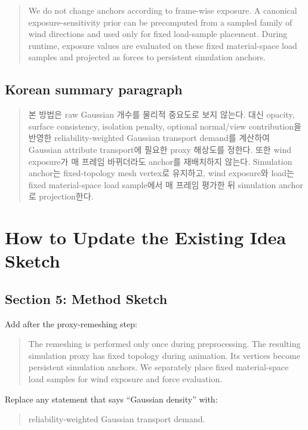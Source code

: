 \documentclass[11pt,a4paper]{article}
\begin{document}
\begin{quote}
We do not change anchors according to frame-wise exposure. A canonical exposure-sensitivity prior can be precomputed from a sampled family of wind directions and used only for fixed load-sample placement. During runtime, exposure values are evaluated on these fixed material-space load samples and projected as forces to persistent simulation anchors.
\end{quote}

\subsection{Korean summary paragraph}

\begin{quote}
본 방법은 raw Gaussian 개수를 물리적 중요도로 보지 않는다. 대신 opacity, surface consistency, isolation penalty, optional normal/view contribution을 반영한 reliability-weighted Gaussian transport demand를 계산하여 Gaussian attribute transport에 필요한 proxy 해상도를 정한다. 또한 wind exposure가 매 프레임 바뀌더라도 anchor를 재배치하지 않는다. Simulation anchor는 fixed-topology mesh vertex로 유지하고, wind exposure와 load는 fixed material-space load sample에서 매 프레임 평가한 뒤 simulation anchor로 projection한다.
\end{quote}

\section{How to Update the Existing Idea Sketch}

\subsection{Section 5: Method Sketch}

Add after the proxy-remeshing step:

\begin{quote}
The remeshing is performed only once during preprocessing. The resulting simulation proxy has fixed topology during animation. Its vertices become persistent simulation anchors. We separately place fixed material-space load samples for wind exposure and force evaluation.
\end{quote}

Replace any statement that says ``Gaussian density'' with:

\begin{quote}
reliability-weighted Gaussian transport demand.
\end{quote}
\end{document}
